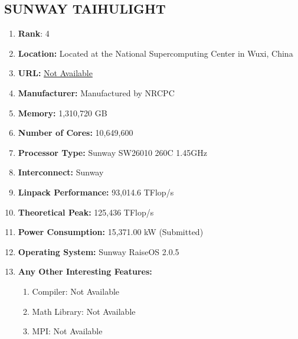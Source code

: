 \documentclass[12pt, a4paper, fleqn, titlepage]{article}
\begin{document}
    \subsection{SUNWAY TAIHULIGHT}
        \begin{flushleft}
            \begin{enumerate}[\textbullet]
                \item \textbf{Rank}: 4
                \item \textbf{Location:} 
                    Located at the National Supercomputing Center in Wuxi, China
                \item \textbf{URL:} 
                    \url{Not Available}
                \item \textbf{Manufacturer:} Manufactured by NRCPC
                \item \textbf{Memory:} 1,310,720 GB
                \item \textbf{Number of Cores:} 10,649,600
                \item \textbf{Processor Type:} Sunway SW26010 260C 1.45GHz
                \item \textbf{Interconnect:} Sunway
                \item \textbf{Linpack Performance:} 93,014.6 TFlop/s
                \item \textbf{Theoretical Peak:} 125,436  TFlop/s
                \item \textbf{Power Consumption:} 15,371.00 kW (Submitted)
                \item \textbf{Operating System:} Sunway RaiseOS 2.0.5
                \item \textbf{Any Other Interesting Features:}
                    \begin{enumerate}
                        \item Compiler: Not Available
                        \item Math Library: Not Available
                        \item MPI: Not Available
                    \end{enumerate}
            \end{enumerate}
        \end{flushleft}
\end{document}
